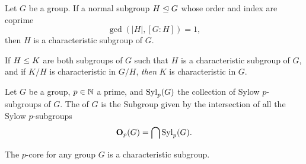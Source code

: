 \begin{theorem}
Let $G$ be a group. If a normal subgroup $H\trianglelefteq G$ whose
order and index are coprime
\begin{equation*}
\gcd(|H|, [G:H])=1,
\end{equation*}
then $H$ is a characteristic subgroup of $G$.
\end{theorem}

\begin{theorem}
If  $H\leq K$ are both subgroups of $G$ such that $H$ is
a characteristic subgroup of $G$, and if $K/H$ is characteristic in
$G/H$, \emph{then} $K$ is characteristic in $G$.
\end{theorem}

\begin{definition}
Let $G$ be a group, $p\in\mathbb{N}$ a prime, and $\mathop{\rm Syl}\nolimits_{p}(G)$ the
collection of Sylow $p$-subgroups of $G$. The  of $G$
is the Subgroup given by the intersection of all the Sylow $p$-subgroups
\begin{equation*}
\mathbf{O}_{p}(G) = \bigcap \mathop{\rm Syl}\nolimits_{p}(G).
\end{equation*}
\end{definition}

\begin{theorem}
The $p$-core for any group $G$ is a characteristic subgroup.
\end{theorem}
